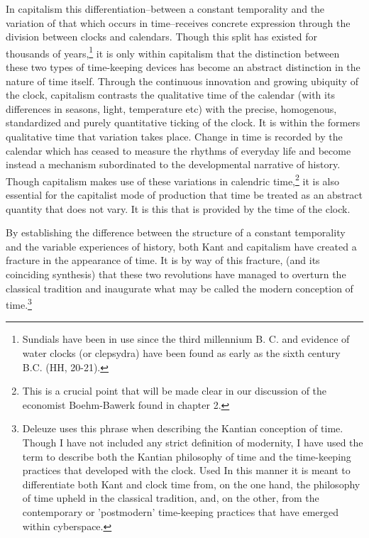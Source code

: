 In capitalism this differentiation--between a constant temporality and the variation of that which occurs in time--receives concrete expression through the division between clocks and calendars. Though this split has existed for thousands of years,\footnote{Sundials have been in use since the third millennium B. C. and evidence of water clocks (or clepsydra) have been found as early as the sixth century B.C. (HH, 20-21).} it is only within capitalism that the distinction between these two types of time-keeping devices has become an abstract distinction in the nature of time itself. Through the continuous innovation and growing ubiquity of the clock, capitalism contrasts the qualitative time of the calendar (with its differences in seasons, light, temperature etc) with the precise, homogenous, standardized and purely quantitative ticking of the clock. It is within the formers qualitative time that variation takes place. Change in time is recorded by the calendar which has ceased to measure the rhythms of everyday life and become instead a mechanism subordinated to the developmental narrative of history. Though capitalism makes use of these  variations in calendric time,\footnote{This is a crucial point that will be made clear in our discussion of the economist Boehm-Bawerk found in chapter 2.} it is also essential for the capitalist mode of production that time be treated as an abstract quantity that does not vary. It is this that is provided by the time of the clock. 

By establishing the difference between the structure of a constant temporality and the variable experiences of history, both Kant and capitalism have created a fracture in the appearance of time. It is by way of this fracture, (and its coinciding synthesis) that these two revolutions have managed to overturn the classical tradition and inaugurate what may be called the modern conception of time.\footnote{Deleuze uses this phrase when describing the Kantian conception of time. Though I have not included any strict definition of modernity, I have used the term to describe both the Kantian philosophy of time and the time-keeping practices that developed with the clock. Used In this manner it is meant to differentiate both Kant and clock time from, on the one hand, the philosophy of time upheld in the classical tradition, and, on the other, from the contemporary or 'postmodern' time-keeping practices that have emerged within cyberspace.}


